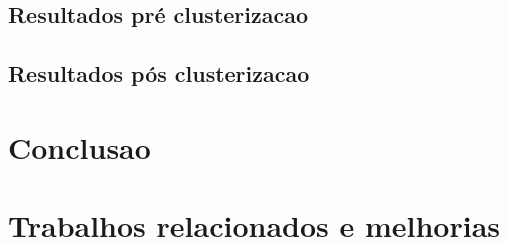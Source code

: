 \subsection{Resultados pré clusterizacao}

\subsection{Resultados pós clusterizacao}

\section{Conclusao}

\section{Trabalhos relacionados e melhorias}




